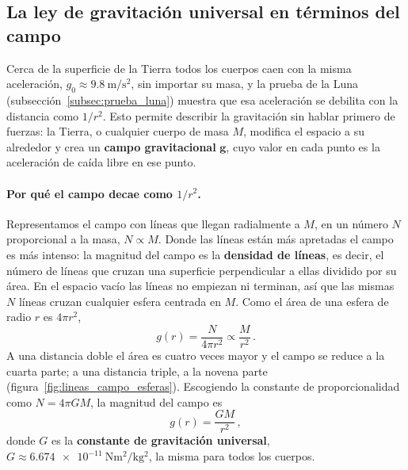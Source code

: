 
\subsection{La ley de gravitación universal en términos del campo}
\label{subsec:gravitacion_campo}

Cerca de la superficie de la Tierra todos los cuerpos caen con la misma
aceleración, $g_0 \approx \SI{9.8}{\meter\per\second\squared}$, sin importar
su masa, y la prueba de la Luna (subsección~\ref{subsec:prueba_luna}) muestra
que esa aceleración se debilita con la distancia como $1/r^{2}$. Esto permite describir la gravitación sin hablar primero de fuerzas:
la Tierra, o cualquier cuerpo de masa $M$, modifica el espacio a su alrededor
y crea un \textbf{campo gravitacional} $\boldsymbol{g}$, cuyo valor en cada
punto es la aceleración de caída libre en ese punto.

\paragraph{Por qué el campo decae como $1/r^{2}$.}
Representamos el campo con líneas que llegan radialmente a $M$, en un número
$N$ proporcional a la masa, $N \propto M$. Donde las líneas están más
apretadas el campo es más intenso: la magnitud del campo es la
\textbf{densidad de líneas}, es decir, el número de líneas que cruzan una
superficie perpendicular a ellas dividido por su área. En el espacio vacío
las líneas no empiezan ni terminan, así que las mismas $N$ líneas cruzan
cualquier esfera centrada en $M$. Como el área de una esfera de radio $r$ es
$4\pi r^{2}$,
\begin{equation}
  g(r) = \frac{N}{4\pi r^{2}} \propto \frac{M}{r^{2}} \,.
  \label{eq:densidad_lineas}
\end{equation}
A una distancia doble el área es cuatro veces mayor y el campo se reduce a la
cuarta parte; a una distancia triple, a la novena parte
(figura~\ref{fig:lineas_campo_esferas}). Escogiendo la constante de
proporcionalidad como $N = 4\pi G M$, la magnitud del campo es
\begin{equation}
  g(r) = \frac{G M}{r^{2}} \,,
  \label{eq:campo_g}
\end{equation}
donde $G$ es la \textbf{constante de gravitación universal},
$G \approx \SI{6.674e-11}{\newton\meter\squared\per\kilo\gram\squared}$, la
misma para todos los cuerpos.

